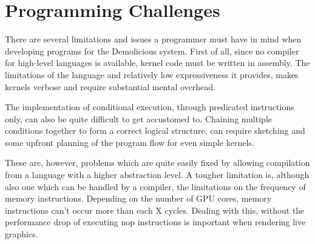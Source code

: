 \section{Programming Challenges}

There are several limitations and issues a programmer must have in mind when developing programs for the Demolicious system.
First of all, since no compiler for high-level languages is available, kernel code must be written in assembly.
The limitations of the language and relatively low expressiveness it provides,
makes kernels verbose and require substantial mental overhead.

The implementation of conditional execution, through predicated instructions only,
can also be quite difficult to get accustomed to.
Chaining multiple conditions together to form a correct logical structure,
can require sketching and some upfront planning of the program flow for even simple kernels.

These are, however, problems which are quite easily fixed by allowing compilation from a language with a higher abstraction level.
A tougher limitation is, although also one which can be handled by a compiler,
the limitations on the frequency of memory instructions.
Depending on the number of GPU cores,
memory instructions can't occur more than each X cycles.
Dealing with this, without the performance drop of executing nop instructions
is important when rendering live graphics.
